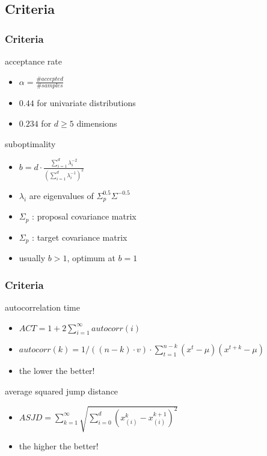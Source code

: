 \subsection{Criteria}
\begin{frame}
\frametitle{Criteria}
\begin{block}{acceptance rate}
\begin{itemize}
  \item $\alpha = \frac{\# accepted}{\# samples}$
  \item $0.44$ for univariate distributions
  \item $0.234$ for $d\geq 5$ dimensions
\end{itemize}

\end{block}
\begin{block}{suboptimality}
\begin{itemize}
  \item $b = d\cdot \frac{\sum_{i=1}^d \lambda_i^{-2}}{(\sum_{i=1}^d
  \lambda_i^{-1})^2}$
  \item $\lambda_i$ are eigenvalues of $\Sigma_p^{0.5}\Sigma^{-0.5}$
  \item $\Sigma_p$ : proposal covariance matrix
  \item $\Sigma_p$ : target covariance matrix
  \item usually $b>1$, optimum at $b=1$
\end{itemize}

\end{block}
\end{frame}

\begin{frame}
\frametitle{Criteria}
\begin{block}{autocorrelation time}
\begin{itemize}
  \item $ACT = 1 + 2\sum_{i=1}^{\infty} autocorr(i)$
  \item $autocorr(k) = 1/((n-k)\cdot v)\cdot 
  \sum_{t=1}^{n-k}(x^t-\mu)(x^{t+k}-\mu)$
  \item the lower the better!
\end{itemize}

\end{block}
\begin{block}{average squared jump distance}
\begin{itemize}
  \item $ASJD = \sum_{k=1}^\infty \sqrt{\sum_{i=0}^d (x_{(i)}^k-x_{(i)}^{k+1})^2}$
  \item the higher the better!
\end{itemize}

\end{block}
\end{frame}